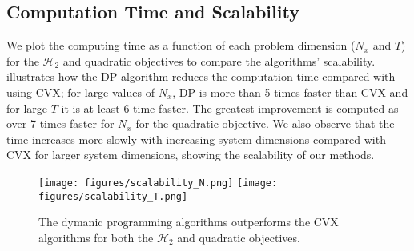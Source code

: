 \subsection{Computation Time and Scalability}
We plot the computing time as a function of each problem dimension ($N_x$ and $T$) for the $\mathcal{H}_2$ and quadratic objectives
to compare the algorithms' scalability.  illustrates how the DP algorithm reduces the computation time compared with
using CVX; for large values of $N_x$, DP is more than 5 times faster than CVX and for large $T$ it is at least 6 time faster. The greatest improvement is computed 
as over 7 times faster for $N_x$ for the quadratic objective. We also observe that the time increases more slowly with increasing system dimensions
compared with CVX for larger system dimensions, showing the scalability of our methods.


\begin{figure}
    \texttt{[image: figures/scalability\_N.png]}
    \texttt{[image: figures/scalability\_T.png]}
    \caption{The dymanic programming algorithms outperforms the CVX algorithms for both the $\mathcal{H}_2$ and quadratic objectives.}
    \label{fig:timing_all}
\end{figure}



